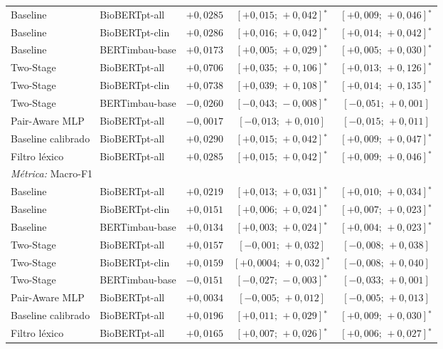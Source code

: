 \begin{longtable}{@{\extracolsep{\fill}}llrcc}
Baseline & BioBERTpt-all & $+0{,}0285$ & $[+0{,}015;\,+0{,}042]$$^{\ast}$ & $[+0{,}009;\,+0{,}046]$$^{\ast}$ \\
Baseline & BioBERTpt-clin & $+0{,}0286$ & $[+0{,}016;\,+0{,}042]$$^{\ast}$ & $[+0{,}014;\,+0{,}042]$$^{\ast}$ \\
Baseline & BERTimbau-base & $+0{,}0173$ & $[+0{,}005;\,+0{,}029]$$^{\ast}$ & $[+0{,}005;\,+0{,}030]$$^{\ast}$ \\
Two-Stage & BioBERTpt-all & $+0{,}0706$ & $[+0{,}035;\,+0{,}106]$$^{\ast}$ & $[+0{,}013;\,+0{,}126]$$^{\ast}$ \\
Two-Stage & BioBERTpt-clin & $+0{,}0738$ & $[+0{,}039;\,+0{,}108]$$^{\ast}$ & $[+0{,}014;\,+0{,}135]$$^{\ast}$ \\
Two-Stage & BERTimbau-base & $-0{,}0260$ & $[-0{,}043;\,-0{,}008]$$^{\ast}$ & $[-0{,}051;\,+0{,}001]$ \\
Pair-Aware MLP & BioBERTpt-all & $-0{,}0017$ & $[-0{,}013;\,+0{,}010]$ & $[-0{,}015;\,+0{,}011]$ \\
Baseline calibrado & BioBERTpt-all & $+0{,}0290$ & $[+0{,}015;\,+0{,}042]$$^{\ast}$ & $[+0{,}009;\,+0{,}047]$$^{\ast}$ \\
Filtro léxico & BioBERTpt-all & $+0{,}0285$ & $[+0{,}015;\,+0{,}042]$$^{\ast}$ & $[+0{,}009;\,+0{,}046]$$^{\ast}$ \\
\midrule
\multicolumn{5}{l}{\textit{Métrica:} Macro-F1} \\*
Baseline & BioBERTpt-all & $+0{,}0219$ & $[+0{,}013;\,+0{,}031]$$^{\ast}$ & $[+0{,}010;\,+0{,}034]$$^{\ast}$ \\
Baseline & BioBERTpt-clin & $+0{,}0151$ & $[+0{,}006;\,+0{,}024]$$^{\ast}$ & $[+0{,}007;\,+0{,}023]$$^{\ast}$ \\
Baseline & BERTimbau-base & $+0{,}0134$ & $[+0{,}003;\,+0{,}024]$$^{\ast}$ & $[+0{,}004;\,+0{,}023]$$^{\ast}$ \\
Two-Stage & BioBERTpt-all & $+0{,}0157$ & $[-0{,}001;\,+0{,}032]$ & $[-0{,}008;\,+0{,}038]$ \\
Two-Stage & BioBERTpt-clin & $+0{,}0159$ & $[+0{,}0004;\,+0{,}032]$$^{\ast}$ & $[-0{,}008;\,+0{,}040]$ \\
Two-Stage & BERTimbau-base & $-0{,}0151$ & $[-0{,}027;\,-0{,}003]$$^{\ast}$ & $[-0{,}033;\,+0{,}001]$ \\
Pair-Aware MLP & BioBERTpt-all & $+0{,}0034$ & $[-0{,}005;\,+0{,}012]$ & $[-0{,}005;\,+0{,}013]$ \\
Baseline calibrado & BioBERTpt-all & $+0{,}0196$ & $[+0{,}011;\,+0{,}029]$$^{\ast}$ & $[+0{,}009;\,+0{,}030]$$^{\ast}$ \\
Filtro léxico & BioBERTpt-all & $+0{,}0165$ & $[+0{,}007;\,+0{,}026]$$^{\ast}$ & $[+0{,}006;\,+0{,}027]$$^{\ast}$ \\
\end{longtable}

